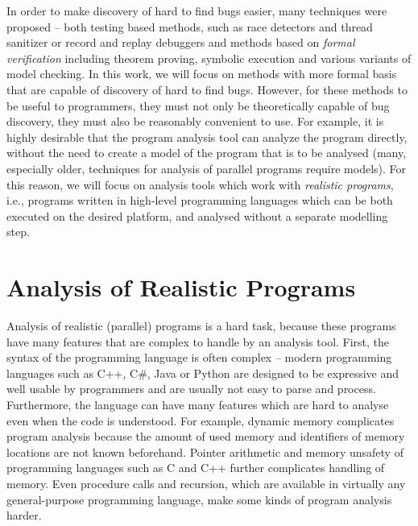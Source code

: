 In order to make discovery of hard to find bugs easier, many techniques were proposed -- both testing based methods, such as race detectors and thread sanitizer or record and replay debuggers  and methods based on \emph{formal verification} including theorem proving, symbolic execution and various variants of model checking.
In this work, we will focus on methods with more formal basis that are capable of discovery of hard to find bugs.
However, for these methods to be useful to programmers, they must not only be theoretically capable of bug discovery, they must also be reasonably convenient to use.
For example, it is highly desirable that the program analysis tool can analyze the program directly, without the need to create a model of the program that is to be analysed (many, especially older, techniques for analysis of parallel programs require models).
For this reason, we will focus on analysis tools which work with \emph{realistic programs}, i.e., programs written in high-level programming languages which can be both executed on the desired platform, and analysed without a separate modelling step.

\section{Analysis of Realistic Programs}

Analysis of realistic (parallel) programs is a hard task, because these programs have many features that are complex to handle by an analysis tool.
First, the syntax of the programming language is often complex -- modern programming languages such as C++, C\#, Java or Python are designed to be expressive and well usable by programmers and are usually not easy to parse and process.
Furthermore, the language can have many features which are hard to analyse even when the code is understood.
For example, dynamic memory complicates program analysis because the amount of used memory and identifiers of memory locations are not known beforehand.
Pointer arithmetic and memory unsafety of programming languages such as C and C++ further complicates handling of memory.
Even procedure calls and recursion, which are available in virtually any general-purpose programming language, make some kinds of program analysis harder.

